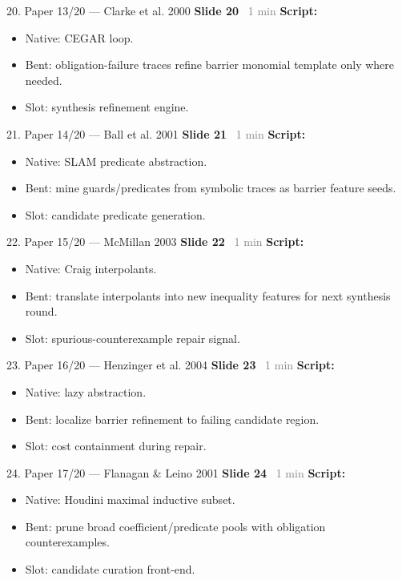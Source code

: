 \documentclass[aspectratio=169]{beamer}
\newcommand{\syncline}[2]{\textbf{#1} \hfill \textcolor{gray}{#2}}
\begin{document}
\begin{frame}[shrink=18]{20. Paper 13/20 — Clarke et al. 2000}
\syncline{Slide 20}{~1 min}
\textbf{Script:}
\begin{itemize}
  \item Native: CEGAR loop.
  \item Bent: obligation-failure traces refine barrier monomial template only where needed.
  \item Slot: synthesis refinement engine.
\end{itemize}
\end{frame}

\begin{frame}[shrink=18]{21. Paper 14/20 — Ball et al. 2001}
\syncline{Slide 21}{~1 min}
\textbf{Script:}
\begin{itemize}
  \item Native: SLAM predicate abstraction.
  \item Bent: mine guards/predicates from symbolic traces as barrier feature seeds.
  \item Slot: candidate predicate generation.
\end{itemize}
\end{frame}

\begin{frame}[shrink=18]{22. Paper 15/20 — McMillan 2003}
\syncline{Slide 22}{~1 min}
\textbf{Script:}
\begin{itemize}
  \item Native: Craig interpolants.
  \item Bent: translate interpolants into new inequality features for next synthesis round.
  \item Slot: spurious-counterexample repair signal.
\end{itemize}
\end{frame}

\begin{frame}[shrink=18]{23. Paper 16/20 — Henzinger et al. 2004}
\syncline{Slide 23}{~1 min}
\textbf{Script:}
\begin{itemize}
  \item Native: lazy abstraction.
  \item Bent: localize barrier refinement to failing candidate region.
  \item Slot: cost containment during repair.
\end{itemize}
\end{frame}

\begin{frame}[shrink=18]{24. Paper 17/20 — Flanagan \& Leino 2001}
\syncline{Slide 24}{~1 min}
\textbf{Script:}
\begin{itemize}
  \item Native: Houdini maximal inductive subset.
  \item Bent: prune broad coefficient/predicate pools with obligation counterexamples.
  \item Slot: candidate curation front-end.
\end{itemize}
\end{frame}
\end{document}
